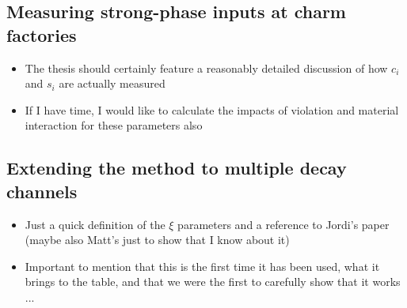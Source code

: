
\subsection{Measuring strong-phase inputs at charm factories} %
\label{sub:measuring_strong_phase_inputs_at_charm_factories}

\begin{itemize}
    \item The thesis should certainly feature a reasonably detailed discussion of how $c_i$ and $s_i$ are actually measured
    \item If I have time, I would like to calculate the impacts of \KS \CP violation and material interaction for these parameters also
\end{itemize}


\subsection{Extending the method to multiple decay channels} %
\label{sub:extending_the_method_to_multiple_decay_channels}

\begin{itemize}
    \item Just a quick definition of the $\xi$ parameters and a reference to Jordi's paper (maybe also Matt's just to show that I know about it)
    \item Important to mention that this is the first time it has been used, what it brings to the table, and that we were the first to carefully show that it works ... 
\end{itemize}



